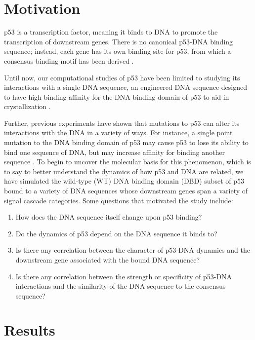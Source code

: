 \section{Motivation}

p53 is a transcription factor, meaning it binds to DNA to promote the transcription of downstream genes. There is no canonical p53-DNA binding sequence; instead, each gene has its own binding site for p53, from which a consensus binding motif has been derived \parencite{el-deiryDefinitionConsensusBinding1992}.

Until now, our computational studies of p53 have been limited to studying its interactions with a single DNA sequence, an engineered DNA sequence designed to have high binding affinity for the DNA binding domain of p53 to aid in crystallization \parencite{choCrystalStructureP531994}.

Further, previous experiments have shown that mutations to p53 can alter its interactions with the DNA in a variety of ways. For instance, a single point mutation to the DNA binding domain of p53 may cause p53 to lose its ability to bind one sequence of DNA, but may increase affinity for binding another sequence \parencite{resnickFunctionalMutantsSequencespecific2003}. To begin to uncover the molecular basis for this phenomenon, which is to say to better understand the dynamics of how p53 and DNA are related, we have simulated the wild-type (WT) DNA binding domain (DBD) subset of p53 bound to a variety of DNA sequences whose downstream genes span a variety of signal cascade categories. Some questions that motivated the study include:

\begin{enumerate}
\item How does the DNA sequence itself change upon p53 binding?
\item Do the dynamics of p53 depend on the DNA sequence it binds to?
\item Is there any correlation between the character of p53-DNA dynamics and the downstream gene associated with the bound DNA sequence?
\item Is there any correlation between the strength or specificity of p53-DNA interactions and the similarity of the DNA sequence to the consensus sequence?
\end{enumerate}

\section{Results}

